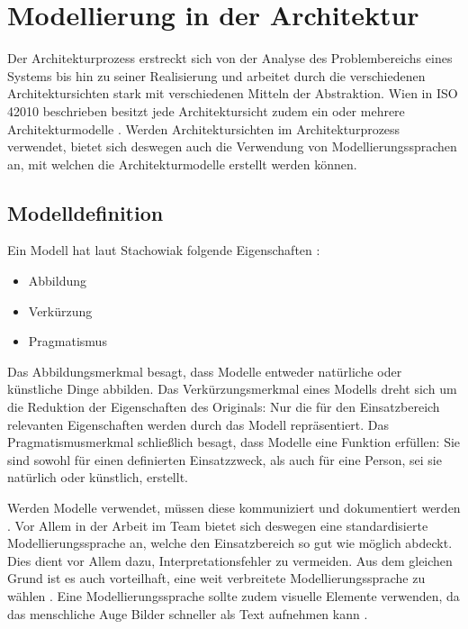 \chapter{Modellierung in der Architektur}
Der Architekturprozess \glqq erstreckt sich von der Analyse des Problembereichs eines Systems bis hin zu seiner Realisierung\grqq \cite[S. 10]{softarch} und arbeitet durch die verschiedenen Architektursichten stark mit verschiedenen Mitteln der Abstraktion. Wien in ISO 42010 beschrieben besitzt jede Architektursicht zudem ein oder mehrere Architekturmodelle \cite{ISO_ARCH}. Werden Architektursichten im Architekturprozess verwendet, bietet sich deswegen auch die Verwendung von Modellierungssprachen an, mit welchen die Architekturmodelle erstellt werden können.

\section{Modelldefinition}
Ein Modell hat laut Stachowiak folgende Eigenschaften \cite[S. 131-133]{modell}:

\begin{itemize}
  \item Abbildung
  \item Verkürzung
  \item Pragmatismus
\end{itemize}

Das Abbildungsmerkmal besagt, dass Modelle entweder natürliche oder künstliche Dinge abbilden. Das Verkürzungsmerkmal eines Modells dreht sich um die Reduktion der Eigenschaften des Originals: Nur die für den Einsatzbereich relevanten Eigenschaften werden durch das Modell repräsentiert. Das Pragmatismusmerkmal schließlich besagt, dass Modelle eine Funktion erfüllen: Sie sind sowohl für einen definierten Einsatzzweck, als auch für eine Person, sei sie natürlich oder künstlich, erstellt. \cite[S. 131-133]{modell}

Werden Modelle verwendet, müssen diese kommuniziert und dokumentiert werden \cite[S. 12]{reqanalysis}. Vor Allem in der Arbeit im Team bietet sich deswegen eine standardisierte Modellierungssprache an, welche den Einsatzbereich so gut wie möglich abdeckt. Dies dient vor Allem dazu, Interpretationsfehler zu vermeiden. Aus dem gleichen Grund ist es auch vorteilhaft, eine weit verbreitete Modellierungssprache zu wählen \cite[S. 139]{effektiv}. Eine Modellierungssprache sollte zudem visuelle Elemente verwenden, da das menschliche Auge Bilder schneller als Text aufnehmen kann \cite[S. 12]{reqanalysis}.

